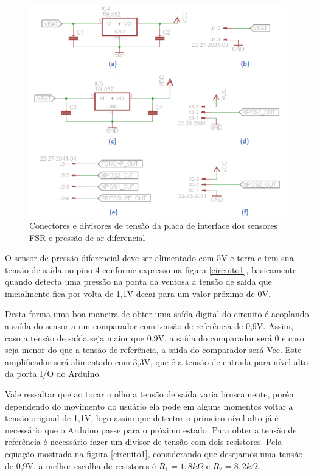 \begin{figure}[H]
		\centering
			\includegraphics[scale=1.0]{figuras/conectdiv.png}
		\caption{Conectores e divisores de tensão da placa de interface dos sensores FSR e pressão de ar diferencial}
		\label{conectdiv}
\end{figure}

O sensor de pressão diferencial deve ser alimentado com 5V e terra e tem sua tensão de saída no pino 4 conforme expresso na figura \ref{circuito1}, basicamente quando detecta uma pressão na ponta da ventosa a tensão de saída que inicialmente fica por volta de 1,1V decai para um valor próximo de 0V. 

Desta forma uma boa maneira de obter uma saída digital do circuito é acoplando a saída do sensor a um comparador com tensão de referência de 0,9V. Assim, caso a tensão de saída seja maior que 0,9V, a saída do comparador será 0 e caso seja menor do que a tensão de referência, a saída do comparador será Vcc. Este amplificador será alimentado com 3,3V, que é a tensão de entrada para nível alto da porta I/O do Arduino. 

Vale ressaltar que ao tocar o olho a tensão de saída varia bruscamente, porém dependendo do movimento do usuário ela pode em alguns momentos voltar a tensão original de 1,1V, logo assim que detectar o primeiro nível alto já é necessário que o Arduino passe para o próximo estado. Para obter a tensão de referência é necessário fazer um divisor de tensão com dois resistores. Pela equação mostrada na figura \ref{circuito1}, considerando que desejamos uma tensão de 0,9V, a melhor escolha de resistores é $R_1 = 1,8 k\Omega$ e $R_2 = 8,2k\Omega$.

